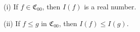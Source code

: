 (i) If $f \in \mathfrak{C}_{00}$, then $I(f)$ is a real number.

(ii) If $f \leq g$ in $\mathfrak{C}_{00}$, then $I(f) \leq I(g)$.